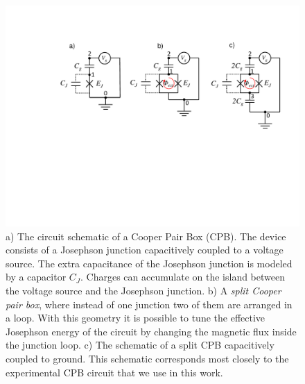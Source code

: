 \begin{figure}
	\centering
	\includegraphics[width=\textwidth]{"./material/figures/introduction/cooper_pair_box"}
	\caption{a) The circuit schematic of a Cooper Pair Box (CPB). The device consists of a Josephson junction capacitively coupled to a voltage source. The extra capacitance of the Josephson junction is modeled by a capacitor $C_J$. Charges can accumulate on the island between the voltage source and the Josephson junction. b) A {\it split Cooper pair box}, where instead of one junction two of them are arranged in a loop. With this geometry it is possible to tune the effective Josephson energy of the circuit by changing the magnetic flux inside the junction loop. c) The schematic of a split CPB capacitively coupled to ground. This schematic corresponds most closely to the experimental CPB circuit that we use in this work.}
	\label{fig:cpb_circuit}
\end{figure}

